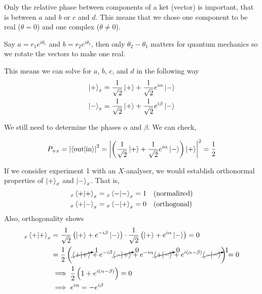 \documentclass[english, 11pt]{article}
\begin{document}
          Only the relative phase between components of a ket (vector) is important, that is between $a$ and $b$ or $c$ and $d$. This means that we chose one component to be real ($\theta = 0$) and one complex ($\theta \not = 0$).
          \newline

          Say $a = r_1e^{i\theta_1}$ and $b = r_2e^{i\theta_2}$, then only $\theta_2 - \theta_1$ matters for quantum mechanics so we rotate the vectors to make one real. \newline

          This means we can solve for $a$, $b$, $c$, and $d$ in the following way
          \begin{align*}
            \left|+\right\rangle_x & = \frac{1}{\sqrt{2}}\left|+\right\rangle + \frac{1}{\sqrt{2}}e^{i\alpha}\left|-\right\rangle \\
            \left|-\right\rangle_x & = \frac{1}{\sqrt{2}}\left|+\right\rangle + \frac{1}{\sqrt{2}}e^{i\beta}\left|-\right\rangle
          \end{align*}

          We still need to determine the phases $\alpha$ and $\beta$. We can check,

          \[ P_{+x} = \left| \braket{\mbox{out}}{\mbox{in}} \right|^2 = \left| \left( \f{1}{\sqrt{2}}\ket{+} + \f{1}{\sqrt{2}}e^{i\alpha}\ket{-} \right) \ket{+} \right|^2 = \f{1}{2}\]

          If we consider experiment 1 with an $X$-analyser, we would establish orthonormal properties of $\left|+\right\rangle_x$ and $\left|-\right\rangle_x$. That is,
          \begin{align*}
            {}_x\braket{+}{+}_x & = {}_x\braket{-}{-}_x = 1 \mbox{ \ \ (normalized)} \\
            {}_x\braket{+}{-}_x & = {}_x\braket{-}{+}_x = 0 \mbox{ \ \ (orthogonal)}
          \end{align*}
          Also, orthogonality shows
          \begin{align*}
            {}_x\braket{+}{+}_x & = \f{1}{\sqrt{2}} \left( \ket{+} + e^{-i\beta}\ket{-} \right)\cdot\f{1}{\sqrt{2}}\left( \ket{+}+e^{i\alpha}\ket{-} \right) = 0 \\
            & = \f{1}{2} \left( \cancelto{1}{\braket{+}{+}} + e^{-i\beta}\cancelto{0}{\braket{-}{+}} + e^{-i\alpha}\cancelto{0}{\braket{+}{-}} + e^{i(\alpha -\beta)}\cancelto{1}{\braket{-}{-}} \right) = 0\\
            & \implies \f{1}{2}\left( 1 + e^{i(\alpha-\beta)} \right) = 0 \\
            & \implies  e^{i\alpha}  = -e^{i\beta}
          \end{align*}
\end{document}
